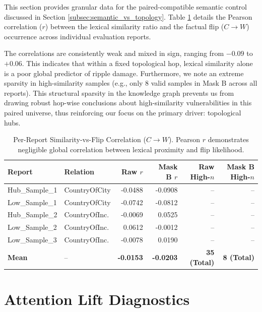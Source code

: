 This section provides granular data for the paired-compatible semantic control discussed in Section \ref{subsec:semantic_vs_topology}. Table \ref{tab:semantic_corr} details the Pearson correlation ($r$) between the lexical similarity ratio and the factual flip ($C \rightarrow W$) occurrence across individual evaluation reports. 

The correlations are consistently weak and mixed in sign, ranging from $-0.09$ to $+0.06$. This indicates that within a fixed topological hop, lexical similarity alone is a poor global predictor of ripple damage. Furthermore, we note an extreme sparsity in high-similarity samples (e.g., only 8 valid samples in Mask B across all reports). This structural sparsity in the knowledge graph prevents us from drawing robust hop-wise conclusions about high-similarity vulnerabilities in this paired universe, thus reinforcing our focus on the primary driver: topological hubs.

\begin{table}[htbp]
\centering
\small
\begin{tabular}{llrrrr}
\toprule
\textbf{Report} & \textbf{Relation} & \textbf{Raw $r$} & \textbf{Mask B $r$} & \textbf{Raw High-$n$} & \textbf{Mask B High-$n$} \\
\midrule
Hub\_Sample\_1 & CountryOfCity & -0.0488 & -0.0908 & -- & -- \\
Low\_Sample\_1  & CountryOfCity & -0.0742 & -0.0812 & -- & -- \\
Hub\_Sample\_2& CountryOfInc. & -0.0069 &  0.0525 & -- & -- \\
Low\_Sample\_2 & CountryOfInc. &  0.0612 & -0.0012 & -- & -- \\
Low\_Sample\_3 & CountryOfInc. & -0.0078 &  0.0190 & -- & -- \\
\midrule
\textbf{Mean} & -- & \textbf{-0.0153} & \textbf{-0.0203} & \textbf{35 (Total)} & \textbf{8 (Total)} \\
\bottomrule
\end{tabular}
\caption{Per-Report Similarity-vs-Flip Correlation ($C \rightarrow W$). Pearson $r$ demonstrates negligible global correlation between lexical proximity and flip likelihood.}
\label{tab:semantic_corr}
\end{table} %
\section{Attention Lift Diagnostics}
\label{app:attention_diagnostics}

